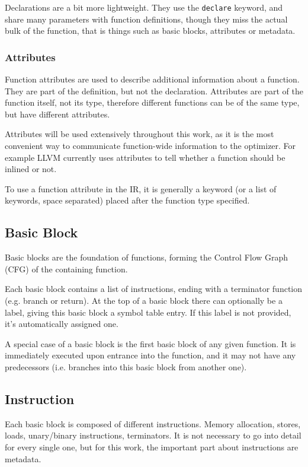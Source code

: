 Declarations are a bit more lightweight. They use the \texttt{declare} keyword, and share many parameters with function definitions, though they miss the actual bulk of the function, that is things such as basic blocks, attributes or metadata.

\subsubsection{Attributes}
Function attributes are used to describe additional information about a function. They are part of the definition, but not the declaration. Attributes are part of the function itself, not its type, therefore different functions can be of the same type, but have different attributes.

Attributes will be used extensively throughout this work, as it is the most convenient way to communicate function-wide information to the optimizer. For example LLVM currently uses attributes to tell whether a function should be inlined or not.

To use a function attribute in the IR, it is generally a keyword (or a list of keywords, space separated) placed after the function type specified.

\subsection{Basic Block}
Basic blocks are the foundation of functions, forming the Control Flow Graph (CFG) of the containing function.

Each basic block contains a list of instructions, ending with a terminator function (e.g. branch or return). At the top of a basic block there can optionally be a label, giving this basic block a symbol table entry. If this label is not provided, it's automatically assigned one.

A special case of a basic block is the first basic block of any given function. It is immediately executed upon entrance into the function, and it may not have any predecessors (i.e. branches into this basic block from another one).

\subsection{Instruction}
Each basic block is composed of different instructions. Memory allocation, stores, loads, unary/binary instructions, terminators. It is not necessary to go into detail for every single one, but for this work, the important part about instructions are metadata.

